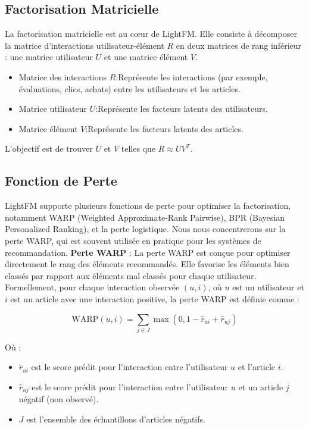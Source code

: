 \documentclass[edit,12pt,a4paper,ChapStyle,oneside,doubleinterligne]{report}
\begin{document}
\subsection{Factorisation Matricielle}
La factorisation matricielle est au cœur de LightFM. Elle consiste à décomposer la matrice d'interactions utilisateur-élément \( R \) en deux matrices de rang inférieur : une matrice utilisateur \( U \) et une matrice élément \( V \).
\begin{itemize}
    \item Matrice des interactions \( R \):Représente les interactions (par exemple, évaluations, clics, achats) entre les utilisateurs et les articles.
    \item Matrice utilisateur \( U \):Représente les facteurs latents des utilisateurs.
    \item Matrice élément \( V \):Représente les facteurs latents des articles.
\end{itemize}
L'objectif est de trouver \( U \) et \( V \) telles que \( R \approx UV^T \).
\subsection{Fonction de Perte}
LightFM supporte plusieurs fonctions de perte pour optimiser la factorisation, notamment WARP (Weighted Approximate-Rank Pairwise), BPR (Bayesian Personalized Ranking), et la perte logistique. Nous nous concentrerons sur la perte WARP, qui est souvent utilisée en pratique pour les systèmes de recommandation.
\newline
\textbf{Perte WARP} :
\newline
La perte WARP est conçue pour optimiser directement le rang des éléments recommandés. Elle favorise les éléments bien classés par rapport aux éléments mal classés pour chaque utilisateur.
\newline
Formellement, pour chaque interaction observée \((u, i)\), où \(u\) est un utilisateur et \(i\) est un article avec une interaction positive, la perte WARP est définie comme :

\[
\text{WARP}(u, i) = \sum_{j \in J} \max(0, 1 - \hat{r}_{ui} + \hat{r}_{uj})
\]

Où :

\begin{itemize}
    \item \(\hat{r}_{ui}\) est le score prédit pour l'interaction entre l'utilisateur \(u\) et l'article \(i\).
    \item \(\hat{r}_{uj}\) est le score prédit pour l'interaction entre l'utilisateur \(u\) et un article \(j\) négatif (non observé).
    \item \(J\) est l'ensemble des échantillons d'articles négatifs.
\end{itemize}
\end{document}
